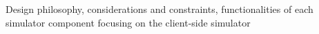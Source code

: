 \begin{itshape}
Design philosophy, considerations and constraints, functionalities of each simulator component focusing on the client-side simulator
\end{itshape}